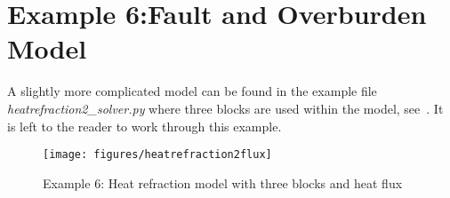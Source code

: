 \section{Example 6:Fault and Overburden Model}
A slightly more complicated model can be found in the example file
\textit{heatrefraction2_solver.py} where three blocks are used within the
model, see~. It is left to the reader to work through
this example.

\begin{figure}[ht]
\centerline{\texttt{[image: figures/heatrefraction2flux]}}
\caption{Example 6: Heat refraction model with three blocks and heat flux}
\label{fig:hr002qumodel}
\end{figure}
\clearpage
